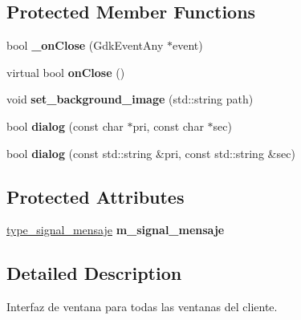 \subsection*{Protected Member Functions}
\begin{DoxyCompactItemize}
\item 
\hypertarget{classWindow_a8ad38ade5b5db7841a1ec0766e8aad75}{bool {\bfseries \-\_\-on\-Close} (Gdk\-Event\-Any $\ast$event)}\label{classWindow_a8ad38ade5b5db7841a1ec0766e8aad75}

\item 
\hypertarget{classWindow_a979cfd2bc52650f07b789217d6c6f570}{virtual bool {\bfseries on\-Close} ()}\label{classWindow_a979cfd2bc52650f07b789217d6c6f570}

\item 
\hypertarget{classWindow_a79dbd85218e5c2387b2d08f296304f50}{void {\bfseries set\-\_\-background\-\_\-image} (std\-::string path)}\label{classWindow_a79dbd85218e5c2387b2d08f296304f50}

\item 
\hypertarget{classWindow_a5837f14ab5bf0904be34909c440229ed}{bool {\bfseries dialog} (const char $\ast$pri, const char $\ast$sec)}\label{classWindow_a5837f14ab5bf0904be34909c440229ed}

\item 
\hypertarget{classWindow_a9891d6779c20eee09f911bbd53a5e45b}{bool {\bfseries dialog} (const std\-::string \&pri, const std\-::string \&sec)}\label{classWindow_a9891d6779c20eee09f911bbd53a5e45b}

\end{DoxyCompactItemize}
\subsection*{Protected Attributes}
\begin{DoxyCompactItemize}
\item 
\hypertarget{classWindow_a0a72d287d0625642dc3e704a61d16f88}{\hyperlink{classWindow_aee13a32f2064bb223c52ed10f8e41cb7}{type\-\_\-signal\-\_\-mensaje} {\bfseries m\-\_\-signal\-\_\-mensaje}}\label{classWindow_a0a72d287d0625642dc3e704a61d16f88}

\end{DoxyCompactItemize}


\subsection{Detailed Description}
Interfaz de ventana para todas las ventanas del cliente. 

